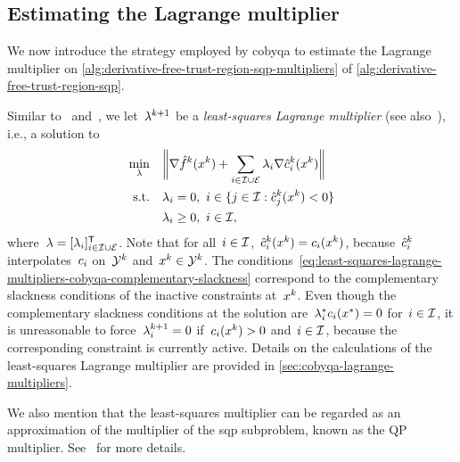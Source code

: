 \subsection{Estimating the Lagrange multiplier}
\label{subsec:least-squares-lagrange-multipliers}

We now introduce the strategy employed by \gls{cobyqa} to estimate the Lagrange multiplier on \cref{alg:derivative-free-trust-region-sqp-multipliers} of \cref{alg:derivative-free-trust-region-sqp}.

Similar to~\cite[\S~15.2, p.~626]{Conn_Gould_Toint_2000} and~\cite[Eq.~(18.22)]{Nocedal_Wright_2006}, we let~$\lm[k + 1]$ be a \emph{least-squares Lagrange multiplier} (see also~\cite[\S~3.3]{Dussault_1995}), i.e., a solution to
\begin{subequations}
    \label{eq:least-squares-lagrange-multipliers-cobyqa}
    \begin{align}
        \min_{\lm}  & \quad \norm[\bigg]{\nabla \objm[k](\iter[k]) + \sum_{i \in \iub \cup \ieq} \lm_i \nabla \conm[k]{i}(\iter[k])}\\
        \text{s.t.} & \quad \lm_i = 0, ~ i \in \set{j \in \iub : \conm[k]{j}(\iter[k]) < 0} \label{eq:least-squares-lagrange-multipliers-cobyqa-complementary-slackness}\\
                    & \quad \lm_i \ge 0, ~ i \in \iub,
    \end{align}
\end{subequations}
where~$\lm = [\lm_i]_{i \in \iub \cup \ieq}^{\T}$.
Note that for all~$i \in \mathcal{I}$,~$\conm[k]{i}(\iter[k]) = \con{i}(\iter[k])$, because~$\conm[k]{i}$ interpolates~$c_{i}$ on~$\xpt[k]$ and~$\iter[k] \in \xpt[k]$.
The conditions~\cref{eq:least-squares-lagrange-multipliers-cobyqa-complementary-slackness} correspond to the complementary slackness conditions of the inactive constraints at~$\iter[k]$.
Even though the complementary slackness conditions at the solution are~$\lm[\ast]_i \con{i}(\iter[\ast]) = 0$ for~$i \in \mathcal{I}$, it is unreasonable to force~$\lm_i^{k + 1} = 0$ if~$\con{i}(\iter[k]) > 0$ and~$i \in \mathcal{I}$, because the corresponding constraint is currently active.
Details on the calculations of the least-squares Lagrange multiplier are provided in \cref{sec:cobyqa-lagrange-multipliers}.

We also mention that the least-squares multiplier can be regarded as an approximation of the multiplier of the \gls{sqp} subproblem, known as the QP multiplier.
See~\cite[pp.~538--539]{Nocedal_Wright_2006} for more details.

